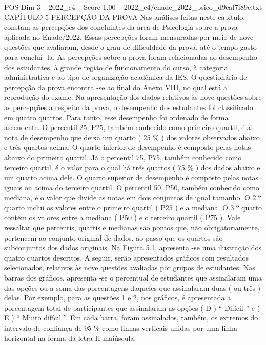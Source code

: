 \begin{textsample}{POS Dim 3 – 2022\_c4 – Score 1.00 – 2022\_c4/enade\_2022\_psico\_d9caf7f89c.txt}  \label{ex:f3_pos_175}
CAPÍTULO 5 PERCEPÇÃO DA PROVA Nas análises feitas neste capítulo, constam as percepções dos concluintes da área de Psicologia sobre a prova aplicada no Enade/2022.
Essas percepções foram mensuradas por meio de nove questões que avaliaram, desde o grau de dificuldade da prova, até o tempo gasto para concluí -la.
As percepções sobre a prova foram relacionadas ao desempenho dos estudantes, à grande região de funcionamento do curso, à categoria administrativa e ao tipo de organização acadêmica da IES.
O questionário de percepção da prova encontra -se ao final do Anexo VIII, no qual está a reprodução do exame.
Na apresentação dos dados relativos às nove questões sobre as percepções a respeito da prova, o desempenho dos estudantes foi classificado em quatro quartos.
Para tanto, esse desempenho foi ordenado de forma ascendente.
O percentil 25, P25, também conhecido como primeiro quartil, é a nota de desempenho que deixa um quarto ( 25 \% ) dos valores observados abaixo e três quartos acima.
O quarto inferior de desempenho é composto pelas notas abaixo do primeiro quartil.
Já o percentil 75, P75, também conhecido como terceiro quartil, é o valor para o qual há três quartos ( 75 \% ) dos dados abaixo e um quarto acima dele.
O quarto superior de desempenho é composto pelas notas iguais ou acima do terceiro quartil.
O percentil 50, P50, também conhecido como mediana, é o valor que divide as notas em dois conjuntos de igual tamanho.
O 2.º quarto inclui os valores entre o primeiro quartil ( P25 ) e a mediana.
O 3.º quarto contém os valores entre a mediana ( P50 ) e o terceiro quartil ( P75 ).
Vale ressaltar que percentis, quartis e medianas são pontos que, não obrigatoriamente, pertencem ao conjunto original de dados, ao passo que os quartos são subconjuntos dos dados originais.
Na Figura 5.1, apresenta -se uma ilustração dos quatro quartos descritos.
A seguir, serão apresentados gráficos com resultados selecionados, relativos às nove questões avaliadas por grupos de estudantes.
Nas barras dos gráficos, apresenta -se o percentual de estudantes que assinalaram uma das opções ou a soma das porcentagens daqueles que assinalaram duas ( ou três ) delas.
Por exemplo, para as questões 1 e 2, nos gráficos, é apresentada a porcentagem total de participantes que assinalaram as opções ( D ) “ Difícil ” e ( E ) “ Muito difícil ”.
Em cada barra, foram assinalados, também, os extremos do intervalo de confiança de 95 \% como linhas verticais unidas por uma linha horizontal na forma da letra H maiúscula.

\end{textsample}
